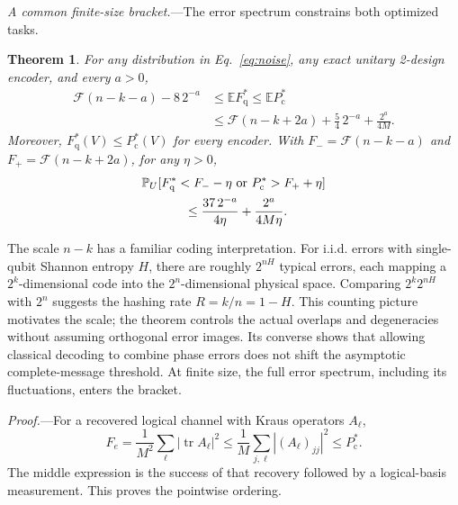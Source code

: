 \documentclass[aps,prl,reprint,superscriptaddress,amsmath,amssymb]{revtex4-2}
\newtheorem{theorem}{Theorem}
\newcommand{\E}{\mathbb E}
\newcommand{\Prb}{\mathbb P}
\newcommand{\tr}{\operatorname{tr}}
\newcommand{\Pc}{P_{\mathrm c}^{*}}
\newcommand{\Fq}{F_{\mathrm q}^{*}}
\newcommand{\Fs}{\mathcal F}
\begin{document}
\emph{A common finite-size bracket.}---The error spectrum constrains both
optimized tasks.
\begin{theorem}
For any distribution in Eq.~\eqref{eq:noise}, any exact unitary 2-design
encoder, and every $a>0$,
\begin{align}
\Fs(n-k-a)-8\,2^{-a}
&\le\E\Fq\le\E\Pc\nonumber\\
&\le\Fs(n-k+2a)+\frac54\,2^{-a}+\frac{2^a}{4M}.
\label{eq:bracket}
\end{align}
Moreover, $\Fq(V)\le\Pc(V)$ for every encoder. With
$F_-=\Fs(n-k-a)$ and $F_+=\Fs(n-k+2a)$, for any $\eta>0$,
\begin{align}
&\Prb_U[\Fq<F_--\eta\ \text{or}\ \Pc>F_++\eta]\nonumber\\
&\hspace{12mm}\le\frac{37\,2^{-a}}{4\eta}+\frac{2^a}{4M\eta}.
\label{eq:highprob}
\end{align}
\end{theorem}

The scale $n-k$ has a familiar coding interpretation. For i.i.d. errors with
single-qubit Shannon entropy $H$, there are roughly $2^{nH}$ typical errors,
each mapping a $2^k$-dimensional
code into the $2^n$-dimensional physical space. Comparing
$2^k2^{nH}$ with $2^n$ suggests the hashing rate $R=k/n=1-H$.
This counting picture motivates the scale; the theorem controls the actual
overlaps and degeneracies without assuming orthogonal error images.
Its converse shows that allowing classical decoding to combine phase errors
does not shift the asymptotic complete-message threshold. At finite size,
the full error spectrum, including its fluctuations, enters the bracket.

\emph{Proof.}---For a recovered logical channel with Kraus operators $A_\ell$,
\begin{equation}
F_e=\frac1{M^2}\sum_\ell|\tr A_\ell|^2
\le\frac1M\sum_{j,\ell}|(A_\ell)_{jj}|^2\le\Pc.
\label{eq:ordering}
\end{equation}
The middle expression is the success of that recovery followed by a
logical-basis measurement. This proves the pointwise ordering.
\end{document}
